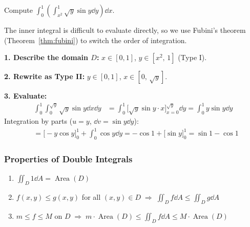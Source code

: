 \begin{example}
  Compute $\displaystyle\int_0^1\!\left(\int_{x^2}^{1}\sqrt{y}\sin y\dd{y}\right)\dd{x}$.

  The inner integral is difficult to evaluate directly, so we use Fubini's theorem (Theorem~\ref{thm:fubini}) to switch the order of integration.

  \textbf{1. Describe the domain $D$:}
  $x\in[0,1]$, \; $y\in[x^2,\,1]$ \quad (Type I).

  \begin{center}
  \end{center}

  \textbf{2. Rewrite as Type II:}
  $y\in[0,1]$, \; $x\in[0,\,\sqrt{y}]$.

  \textbf{3. Evaluate:}
  \begin{align*}
    \int_0^1\!\int_0^{\sqrt{y}}\sqrt{y}\sin y\dd{x}\dd{y}
     & = \int_0^1 \bigl[\sqrt{y}\sin y\cdot x\bigr]_{x=0}^{\sqrt{y}}\dd{y}
    = \int_0^1 y\sin y\dd{y}
  \end{align*}
  Integration by parts ($u=y$, $\dd{v}=\sin y\dd{y}$):
  \begin{align*}
     & = \bigl[-y\cos y\bigr]_0^1 + \int_0^1\cos y\dd{y}
    = -\cos 1 + \bigl[\sin y\bigr]_0^1
    = \sin 1 - \cos 1
  \end{align*}
\end{example}

\subsubsection{Properties of Double Integrals}

\begin{enumerate}
  \item $\displaystyle\iint_D 1\dd{A} = \operatorname{Area}(D)$
  \item $f(x,y)\le g(x,y)$ for all $(x,y)\in D
          \;\Longrightarrow\;
          \displaystyle\iint_D f\dd{A}\le\iint_D g\dd{A}$
  \item $m\le f\le M$ on $D
          \;\Longrightarrow\;
          m\cdot\operatorname{Area}(D)
          \le\displaystyle\iint_D f\dd{A}
          \le M\cdot\operatorname{Area}(D)$
\end{enumerate}

